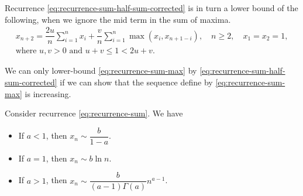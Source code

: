 Recurrence \eqref{eq:recurrence-sum-half-sum-corrected} is in turn a lower bound of the following, when we ignore the mid term in the sum of maxima.
\begin{equation}
  \label{eq:recurrence-sum-max}
  \begin{aligned}
    x_{n+2} = \dfrac{2u}{n}\sum_{i=1}^{n}x_i + \dfrac{v}{n}\sum_{i=1}^{n} \max(x_{i}, x_{n+1-i}), \quad n \ge 2, \quad  x_1=x_2=1, \\
    \text{where } u,v > 0 \text{ and } u+v\le1 < 2u+v.
  \end{aligned}
\end{equation}

We can only lower-bound \eqref{eq:recurrence-sum-max} by \eqref{eq:recurrence-sum-half-sum-corrected} if we can show that the sequence define by \eqref{eq:recurrence-sum-max} is increasing.

\begin{proposition}
  Consider recurrence \eqref{eq:recurrence-sum}. We have
  \begin{itemize}
    \item If $a<1$, then $x_n \sim \dfrac{b}{1-a}$.
    \item If $a=1$, then $x_n \sim b\ln n$.
    \item If $a>1$, then $x_n \sim \dfrac{b}{(a-1)\Gamma(a)} n^{a-1}$.
  \end{itemize}
\end{proposition}

